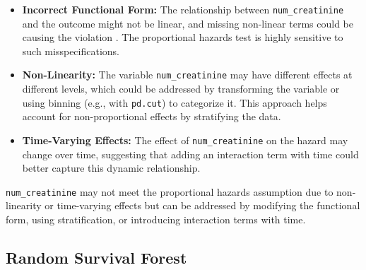 \begin{itemize}
    \item \textbf{Incorrect Functional Form:} The relationship between \texttt{num\_creatinine} and the outcome might not be linear, and missing non-linear terms could be causing the violation \parencite{harrell__regression_2015}. The proportional hazards test is highly sensitive to such misspecifications.
    \item \textbf{Non-Linearity:} The variable \texttt{num\_creatinine} may have different effects at different levels, which could be addressed by transforming the variable or using binning (e.g., with \texttt{pd.cut}) to categorize it. This approach helps account for non-proportional effects by stratifying the data.
    \item \textbf{Time-Varying Effects:} The effect of \texttt{num\_creatinine} on the hazard may change over time, suggesting that adding an interaction term with time could better capture this dynamic relationship.
\end{itemize}

\noindent \texttt{num\_creatinine} may not meet the proportional hazards assumption due to non-linearity or time-varying effects but can be addressed by modifying the functional form, using stratification, or introducing interaction terms with time.

\subsection{Random Survival Forest}

